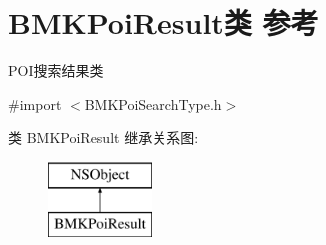 \hypertarget{interface_b_m_k_poi_result}{}\section{B\+M\+K\+Poi\+Result类 参考}
\label{interface_b_m_k_poi_result}


P\+O\+I搜索结果类  




{\ttfamily \#import $<$B\+M\+K\+Poi\+Search\+Type.\+h$>$}

类 B\+M\+K\+Poi\+Result 继承关系图\+:\begin{figure}[H]
\begin{center}
\leavevmode
\includegraphics[height=2.000000cm]{interface_b_m_k_poi_result}
\end{center}
\end{figure}

